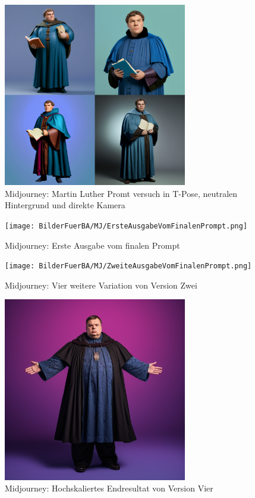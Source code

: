 \documentclass[10pt,a4paper,bibliography=totocnumbered,listof=totocnumbered]{scrartcl}
\begin{document}
\begin{figure}
	\centering
	\includegraphics[width=8.022cm]{BilderFuerBA/MJ/MartinLutherInTPoseFirst.png}
	\caption{Midjourney: Martin Luther Promt versuch in T-Pose, neutralen Hintergrund und direkte Kamera}
	\label{MartinLutherInTPoseNeutralerHintergrundDirekteKamera}
\end{figure}

\begin{figure}
	\centering
	\texttt{[image: BilderFuerBA/MJ/ErsteAusgabeVomFinalenPrompt.png]}
	\caption{Midjourney: Erste Ausgabe vom finalen Prompt}
	\label{ErsteAusgabeVomFinalenPrompt}
\end{figure}

\begin{figure}
	\centering
	\texttt{[image: BilderFuerBA/MJ/ZweiteAusgabeVomFinalenPrompt.png]}
	\caption{Midjourney: Vier weitere Variation von Version Zwei}
	\label{ZweiteAusgabeVomFinalenPrompt}
\end{figure}

\begin{figure}
	\centering
	\includegraphics[width=8.022cm]{BilderFuerBA/MJ/DritteAusgabeVomFinalenPrompt.png}
	\caption{Midjourney: Hochskaliertes Endresultat von Version Vier}
	\label{DritteAusgabeVomFinalenPrompt}
\end{figure}
\end{document}
